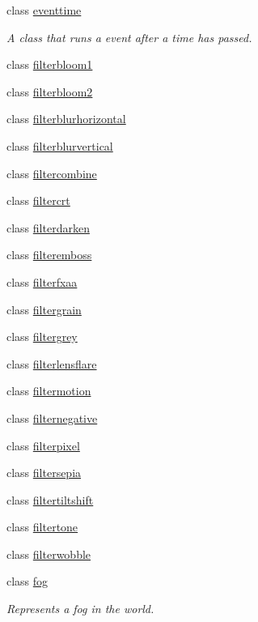 \begin{DoxyCompactItemize}
class \hyperlink{classflounder_1_1eventtime}{eventtime}
\begin{DoxyCompactList}\small\item\em A class that runs a event after a time has passed. \end{DoxyCompactList}\item 
class \hyperlink{classflounder_1_1filterbloom1}{filterbloom1}
\item 
class \hyperlink{classflounder_1_1filterbloom2}{filterbloom2}
\item 
class \hyperlink{classflounder_1_1filterblurhorizontal}{filterblurhorizontal}
\item 
class \hyperlink{classflounder_1_1filterblurvertical}{filterblurvertical}
\item 
class \hyperlink{classflounder_1_1filtercombine}{filtercombine}
\item 
class \hyperlink{classflounder_1_1filtercrt}{filtercrt}
\item 
class \hyperlink{classflounder_1_1filterdarken}{filterdarken}
\item 
class \hyperlink{classflounder_1_1filteremboss}{filteremboss}
\item 
class \hyperlink{classflounder_1_1filterfxaa}{filterfxaa}
\item 
class \hyperlink{classflounder_1_1filtergrain}{filtergrain}
\item 
class \hyperlink{classflounder_1_1filtergrey}{filtergrey}
\item 
class \hyperlink{classflounder_1_1filterlensflare}{filterlensflare}
\item 
class \hyperlink{classflounder_1_1filtermotion}{filtermotion}
\item 
class \hyperlink{classflounder_1_1filternegative}{filternegative}
\item 
class \hyperlink{classflounder_1_1filterpixel}{filterpixel}
\item 
class \hyperlink{classflounder_1_1filtersepia}{filtersepia}
\item 
class \hyperlink{classflounder_1_1filtertiltshift}{filtertiltshift}
\item 
class \hyperlink{classflounder_1_1filtertone}{filtertone}
\item 
class \hyperlink{classflounder_1_1filterwobble}{filterwobble}
\item 
class \hyperlink{classflounder_1_1fog}{fog}
\begin{DoxyCompactList}\small\item\em Represents a fog in the world. \end{DoxyCompactList}\item 

\end{DoxyCompactItemize}
